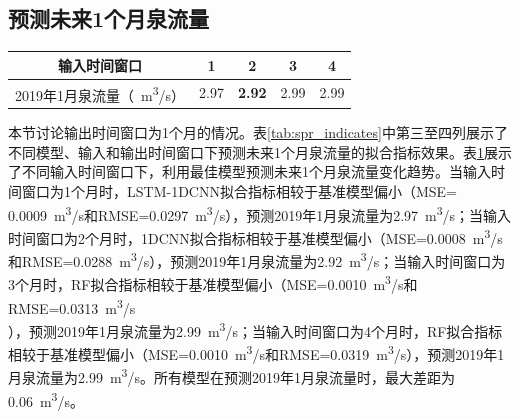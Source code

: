 {\begin{longtable}{clcccccccc}
  \end{longtable}
}

\subsection{预测未来1个月泉流量}\label{sec:spr_one}

\begin{table}[!htbp]
  \centering
  \label{tab:spr_one}
  \footnotesize
  \begin{tabular}{ccccc}
    \toprule
    输入时间窗口 & 1 & 2 & 3 & 4\\
    \midrule
    2019年1月泉流量（\SI{}{m^{3}/s}）& 2.97 & \textbf{2.92} & 2.99 & 2.99 \\
    \bottomrule
  \end{tabular}
\end{table}

本节讨论输出时间窗口为1个月的情况。表\ref{tab:spr_indicates}中第三至四列展示了不同模型、输入和输出时间窗口下预测未来1个月泉流量的拟合指标效果。表\ref{tab:spr_one}展示了不同输入时间窗口下，利用最佳模型预测未来1个月泉流量变化趋势。当输入时间窗口为1个月时，LSTM-1DCNN拟合指标相较于基准模型偏小（MSE=\\\SI{0.0009}{m^{3}/s}和RMSE=\SI{0.0297}{m^{3}/s}），预测2019年1月泉流量为\SI{2.97}{m^{3}/s}；当输入时间窗口为2个月时，1DCNN拟合指标相较于基准模型偏小（MSE=\SI{0.0008}{m^{3}/s}和RMSE=\SI{0.0288}{m^{3}/s}），预测2019年1月泉流量为\SI{2.92}{m^{3}/s}；当输入时间窗口为3个月时，RF拟合指标相较于基准模型偏小（MSE=\SI{0.0010}{m^{3}/s}和RMSE=\SI{0.0313}{m^{3}/s}\\），预测2019年1月泉流量为\SI{2.99}{m^{3}/s}；当输入时间窗口为4个月时，RF拟合指标相较于基准模型偏小（MSE=\SI{0.0010}{m^{3}/s}和RMSE=\SI{0.0319}{m^{3}/s}），预测2019年1月泉流量为\SI{2.99}{m^{3}/s}。所有模型在预测2019年1月泉流量时，最大差距为\SI{0.06}{m^{3}/s}。

